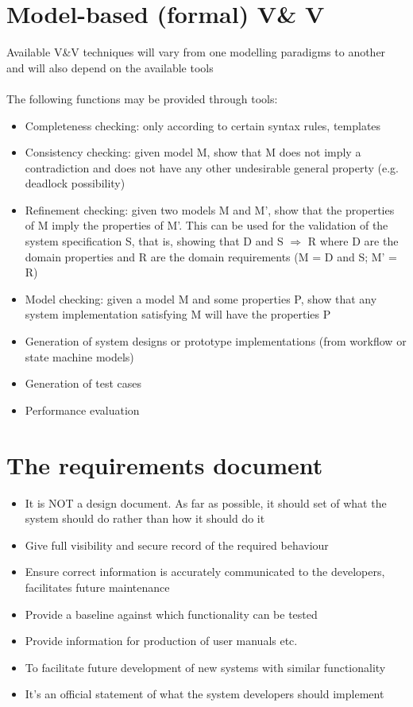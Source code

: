 \documentclass{article}[18pt]
\begin{document}
\section{Model-based (formal) V\& V}
Available V\&V techniques will vary from one modelling paradigms to another and will also depend on the available tools\\
\\
The following functions may be provided through tools:
\begin{itemize}
	\item Completeness checking: only according to certain syntax rules, templates
	\item Consistency checking: given model M, show that M does not imply a contradiction  and does not have any other undesirable general property (e.g. deadlock possibility)
	\item Refinement checking: given two models M and M’, show that the properties of M imply the properties of M’. This can be used for the validation of the system specification S, that is, showing that  D and S $\Rightarrow$ R where D are the domain properties and R are the domain requirements (M = D and S; M’ = R)
	\item Model checking: given a model M and some properties P, show that any system implementation satisfying M will have the properties P
	\item Generation of system designs or prototype implementations (from workflow or state machine models)
	\item Generation of test cases 
	\item Performance evaluation
\end{itemize}
\section{The requirements document}
\begin{itemize}
	\item It is NOT a design document. As far as possible, it should set of what the system should do rather than how it should do it
	\item Give full visibility and secure record of the required behaviour
	\item Ensure correct information is accurately communicated to the developers, facilitates future maintenance
	\item Provide a baseline against which functionality can be tested
	\item Provide information for production of user manuals etc.
	\item To facilitate future development of new systems with similar functionality
	\item It’s an official statement of what the system developers should implement
\end{itemize}
\end{document}
